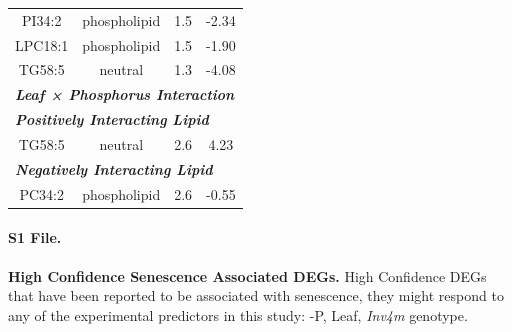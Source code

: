 \documentclass[9pt,twocolumn,twoside]{rilabRxiv}
\newcommand{\invfour}{\textit{Inv4m}\xspace}
\begin{document}
\begin{table}[h!]
\begin{tabular}{cccc}
PI34:2 & phospholipid & 1.5 & -2.34\\
LPC18:1 & phospholipid & 1.5 & -1.90\\
TG58:5 & neutral & 1.3 & -4.08\\
\hline
\multicolumn{4}{l}{\textit{\textbf{Leaf × Phosphorus Interaction}}} \\
\hline
\multicolumn{4}{l}{\textit{\textbf{Positively Interacting Lipid}}} \\
\hline
TG58:5 & neutral & 2.6 & 4.23\\
\hline
\multicolumn{4}{l}{\textit{\textbf{Negatively Interacting Lipid}}} \\
\hline
PC34:2 & phospholipid & 2.6 & -0.55\\
\hline
\end{tabular}
\end{table}

\clearpage


\paragraph*{S1 File.}
\makeatletter
\def\@currentlabelname{S1 File.}
\makeatother
\label{S1_File}
\textbf{High Confidence Senescence Associated DEGs.} High Confidence DEGs that have been reported to be associated with senescence, they might respond to any of the experimental predictors in this study: -P, Leaf, \invfour genotype.
\end{document}
